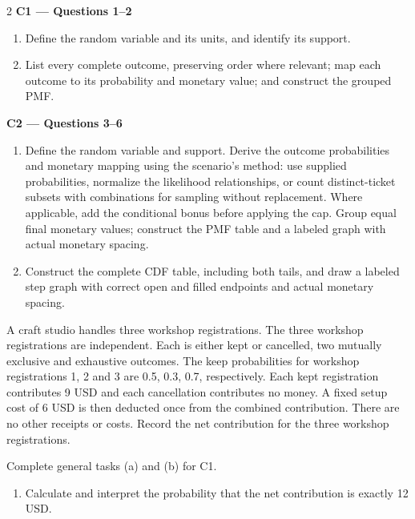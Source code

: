 \begin{multicols*}{2}
\textbf{C1 --- Questions 1--2}
\begin{enumerate}[label=(\alph*)]
\item Define the random variable and its units, and identify its support.
\item List every complete outcome, preserving order where relevant; map each outcome to its probability and monetary value; and construct the grouped PMF.
\end{enumerate}
\noindent\begin{minipage}{\linewidth}
\textbf{C2 --- Questions 3--6}
\begin{enumerate}[label=(\alph*)]
\item Define the random variable and support. Derive the outcome probabilities and monetary mapping using the scenario's method: use supplied probabilities, normalize the likelihood relationships, or count distinct-ticket subsets with combinations for sampling without replacement. Where applicable, add the conditional bonus before applying the cap. Group equal final monetary values; construct the PMF table and a labeled graph with actual monetary spacing.
\item Construct the complete CDF table, including both tails, and draw a labeled step graph with correct open and filled endpoints and actual monetary spacing.
\end{enumerate}
\end{minipage}\par

\noindent\begin{minipage}{\linewidth}
A craft studio handles three workshop registrations. The three workshop registrations are independent. Each is either kept or cancelled, two mutually exclusive and exhaustive outcomes. The keep probabilities for workshop registrations 1, 2 and 3 are 0.5, 0.3, 0.7, respectively. Each kept registration contributes 9 USD and each cancellation contributes no money. A fixed setup cost of 6 USD is then deducted once from the combined contribution. There are no other receipts or costs. Record the net contribution for the three workshop registrations.

Complete general tasks (a)  and (b)  for C1.
\begin{enumerate}[label=(\alph*),start=3]
\item {} Calculate and interpret the probability that the net contribution is exactly 12 USD.
\end{enumerate}
\end{minipage}\par\medskip


\end{multicols*}
